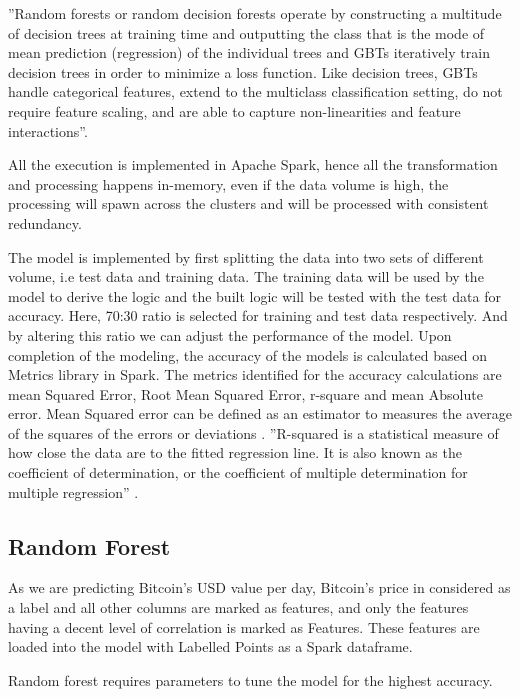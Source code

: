 \documentclass[sigconf]{acmart}
\begin{document}
''Random forests or random decision forests operate by constructing a multitude of decision trees at training time and outputting the class that is the mode of mean prediction (regression) of the individual trees and GBTs iteratively train decision trees in order to minimize a loss function. Like decision trees, GBTs handle categorical features, extend to the multiclass classification setting, do not require feature scaling, and are able to capture non-linearities and feature interactions''\cite{Ensemble4:online}.

All the execution is implemented in Apache Spark, hence all the transformation and processing happens in-memory, even if the data volume is high, the processing will spawn across the clusters and will be processed with consistent redundancy.

The model is implemented by first splitting the data into two sets of different volume, i.e test data and training data. The training data will be used by the model to derive the logic and the built logic will be tested with the test data for accuracy. Here, 70:30 ratio is selected for training and test data respectively. And by altering this ratio we can adjust the performance of the model. Upon completion of the modeling, the accuracy of the models is calculated based on Metrics library in Spark. The metrics identified for the accuracy calculations are mean Squared Error, Root Mean Squared Error, r-square and mean Absolute error. Mean Squared error can be defined as an estimator to measures the average of the squares of the errors or deviations \cite{MSE}. ''R-squared is a statistical measure of how close the data are to the fitted regression line. It is also known as the coefficient of determination, or the coefficient of multiple determination for multiple regression'' \cite{rsq:online}.



\subsection{Random Forest}
As we are predicting Bitcoin's USD value per day, Bitcoin's price in considered as a label and all other columns are marked as features, and only the features having a decent level of correlation is marked as Features. These features are loaded into the model with Labelled Points as a Spark dataframe.

Random forest requires parameters to tune the model for the highest accuracy. 
\end{document}
